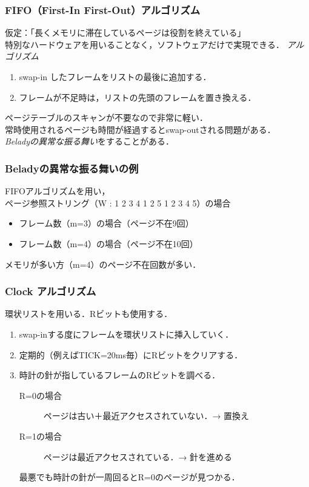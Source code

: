\documentclass[unicode,handout]{beamer}                   %
\begin{document}
\begin{frame}
  \frametitle{FIFO（First-In First-Out）アルゴリズム}
  仮定：「長くメモリに滞在しているページは役割を終えている」\\
  特別なハードウェアを用いることなく，ソフトウェアだけで実現できる．
  \vfill
  \emph{アルゴリズム}
  \begin{enumerate}
  \item[1.] swap-in したフレームをリストの最後に追加する．
  \item[2.] フレームが不足時は，リストの先頭のフレームを置き換える．
  \end{enumerate}
  \vfill
  ページテーブルのスキャンが不要なので非常に軽い．\\
  常時使用されるページも時間が経過するとswap-outされる問題がある．\\
  \emph{Beladyの異常な振る舞い}をすることがある．
\end{frame}

\begin{frame}
  \frametitle{Beladyの異常な振る舞いの例}
  \vfill
  FIFOアルゴリズムを用い，\\
  ページ参照ストリング（W : 1 2 3 4 1 2 5 1 2 3 4 5）の場合
  \begin{itemize}
  \item フレーム数（m=3）の場合（ページ不在9回）\\
    \vspace{3mm}
  \item フレーム数（m=4）の場合（ページ不在10回）\\
    \vspace{3mm}
  \end{itemize}
  メモリが多い方（m=4）のページ不在回数が多い．
  \vfill
\end{frame}

\begin{frame}
  \frametitle{Clock アルゴリズム}
  環状リストを用いる．Rビットも使用する．


  \begin{enumerate}
  \item[1.] swap-inする度にフレームを環状リストに挿入していく．
  \item[2.] 定期的（例えばTICK=20ms毎）にRビットをクリアする．
  \item[3.] 時計の針が指しているフレームのRビットを調べる．
    \begin{description}
    \item[R=0の場合]
      ページは古い＋最近アクセスされていない．→ 置換え
    \item[R=1の場合]
      ページは最近アクセスされている．→ 針を進める
    \end{description}
    最悪でも時計の針が一周回るとR=0のページが見つかる．
  \end{enumerate}
\end{frame}
\end{document}

